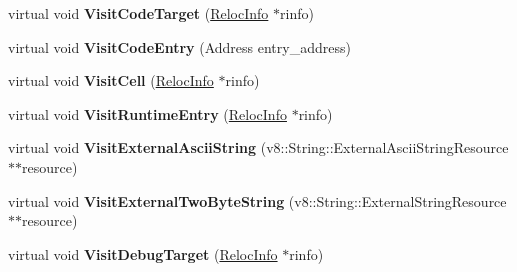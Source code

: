 \begin{DoxyCompactItemize}
\item 
\hypertarget{classv8_1_1internal_1_1_b_a_s_e___e_m_b_e_d_d_e_d_a78f706b383d4fee35bb728e3673d5270}{}virtual void {\bfseries Visit\+Code\+Target} (\hyperlink{classv8_1_1internal_1_1_reloc_info}{Reloc\+Info} $\ast$rinfo)\label{classv8_1_1internal_1_1_b_a_s_e___e_m_b_e_d_d_e_d_a78f706b383d4fee35bb728e3673d5270}

\item 
\hypertarget{classv8_1_1internal_1_1_b_a_s_e___e_m_b_e_d_d_e_d_a35ed1792280290969663f82a36fb153e}{}virtual void {\bfseries Visit\+Code\+Entry} (Address entry\+\_\+address)\label{classv8_1_1internal_1_1_b_a_s_e___e_m_b_e_d_d_e_d_a35ed1792280290969663f82a36fb153e}

\item 
\hypertarget{classv8_1_1internal_1_1_b_a_s_e___e_m_b_e_d_d_e_d_ae893d974f9b34768a19dfffb1414e548}{}virtual void {\bfseries Visit\+Cell} (\hyperlink{classv8_1_1internal_1_1_reloc_info}{Reloc\+Info} $\ast$rinfo)\label{classv8_1_1internal_1_1_b_a_s_e___e_m_b_e_d_d_e_d_ae893d974f9b34768a19dfffb1414e548}

\item 
\hypertarget{classv8_1_1internal_1_1_b_a_s_e___e_m_b_e_d_d_e_d_a6ff1d011dcbcd31da437868c53a983d4}{}virtual void {\bfseries Visit\+Runtime\+Entry} (\hyperlink{classv8_1_1internal_1_1_reloc_info}{Reloc\+Info} $\ast$rinfo)\label{classv8_1_1internal_1_1_b_a_s_e___e_m_b_e_d_d_e_d_a6ff1d011dcbcd31da437868c53a983d4}

\item 
\hypertarget{classv8_1_1internal_1_1_b_a_s_e___e_m_b_e_d_d_e_d_ab1f565dbdf36867e700daa33e7ea12a3}{}virtual void {\bfseries Visit\+External\+Ascii\+String} (v8\+::\+String\+::\+External\+Ascii\+String\+Resource $\ast$$\ast$resource)\label{classv8_1_1internal_1_1_b_a_s_e___e_m_b_e_d_d_e_d_ab1f565dbdf36867e700daa33e7ea12a3}

\item 
\hypertarget{classv8_1_1internal_1_1_b_a_s_e___e_m_b_e_d_d_e_d_a6039f90e16871c79474b2d0826f3ad66}{}virtual void {\bfseries Visit\+External\+Two\+Byte\+String} (v8\+::\+String\+::\+External\+String\+Resource $\ast$$\ast$resource)\label{classv8_1_1internal_1_1_b_a_s_e___e_m_b_e_d_d_e_d_a6039f90e16871c79474b2d0826f3ad66}

\item 
\hypertarget{classv8_1_1internal_1_1_b_a_s_e___e_m_b_e_d_d_e_d_aab493085a86ef1c2e9e4a6eb8846d5c8}{}virtual void {\bfseries Visit\+Debug\+Target} (\hyperlink{classv8_1_1internal_1_1_reloc_info}{Reloc\+Info} $\ast$rinfo)\label{classv8_1_1internal_1_1_b_a_s_e___e_m_b_e_d_d_e_d_aab493085a86ef1c2e9e4a6eb8846d5c8}


\end{DoxyCompactItemize}

